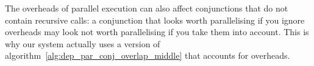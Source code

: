 
The overheads of parallel execution can also affect conjunctions
that do not contain recursive calls:
a conjunction that looks worth parallelising if you ignore overheads
may look not worth parallelising if you take them into account.
This is why our system actually uses
a version of algorithm~\ref{alg:dep_par_conj_overlap_middle}
that accounts for overheads.

